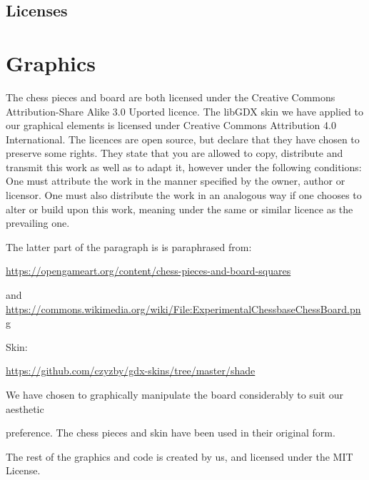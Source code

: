 \documentclass[a4paper, 11pt]{article}
\begin{document}
\noindent

\begin{center}
\section*{Licenses}
\end{center}
\vspace{10 mm}
\section*{Graphics}
The chess pieces and board are both licensed under the Creative Commons Attribution-Share Alike 3.0 Uported licence. The libGDX skin we have applied to our graphical elements is licensed under Creative Commons Attribution 4.0 International. The licences are open source, but declare that they have chosen to preserve some rights. They state that you are allowed to copy, distribute and transmit this work as well as to adapt it, however under the following conditions: One must attribute the work in the manner specified by the owner, author or licensor. One must also distribute the work in an analogous way if one chooses to alter or build upon this work, meaning under the same or similar licence as the prevailing one. 

\vspace{5 mm}
\noindent
The latter part of the paragraph is is paraphrased from:

\vspace{3 mm}
\noindent
\url{https://opengameart.org/content/chess-pieces-and-board-squares}

\vspace{3 mm}
\noindent
and \url{https://commons.wikimedia.org/wiki/File:ExperimentalChessbaseChessBoard.png }

\vspace{5 mm}
\noindent
Skin:

\url{https://github.com/czyzby/gdx-skins/tree/master/shade}

\vspace{10mm}
\noindent
We have chosen to graphically manipulate the board considerably to suit our aesthetic 

\noindent
preference. The chess pieces and skin have been used in their original form.

\vspace{1mm}
\noindent
The rest of the graphics and code is created by us, and licensed under the MIT License. 
\end{document}
